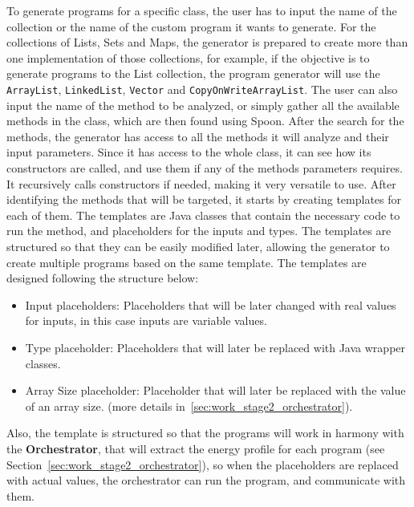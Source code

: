 
To generate programs for a specific class, the user has to input the name of the collection or the name of the custom program it wants to generate. For the collections of Lists, Sets and Maps, the generator is prepared to create more than one implementation of those collections, for example, if the objective is to generate programs to the List collection, the program generator will use the \texttt{ArrayList}, \texttt{LinkedList}, \texttt{Vector} and \texttt{CopyOnWriteArrayList}. The user can also input the name of the method to be analyzed, or simply gather all the available methods in the class, which are then found using Spoon.
After the search for the methods, the generator has access to all the methods it will analyze and their input parameters. Since it has access to the whole class, it can see how its constructors are called, and use them if any of the methods parameters requires. It recursively calls constructors if needed, making it very versatile to use. After identifying the methods that will be targeted, it starts by creating templates for each of them. The templates are Java classes that contain the necessary code to run the method, and placeholders for the inputs and types. The templates are structured so that they can be easily modified later, allowing the generator to create multiple programs based on the same template. The templates are designed following the structure below:

\begin{itemize}

\item Input placeholders: Placeholders that will be later changed with real values for inputs, in this case inputs are variable values. 

\item Type placeholder: Placeholders that will later be replaced with Java wrapper classes.
  
\item Array Size placeholder: Placeholder that will later be replaced with the value of an array size. (more details in~\ref{sec:work_stage2_orchestrator}). 

\end{itemize}

Also, the template is structured so that the programs will work in harmony with the \textbf{Orchestrator}, that will extract the energy profile for each program (see Section~\ref{sec:work_stage2_orchestrator}), so when the placeholders are replaced with actual values, the orchestrator can run the program, and communicate with them.


